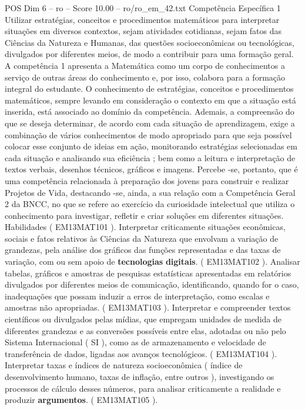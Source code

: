\begin{textsample}{POS Dim 6 – ro – Score 10.00 – ro/ro\_em\_42.txt}  \label{ex:f6_pos_134}
Competência Específica 1 Utilizar estratégias, conceitos e procedimentos matemáticos para interpretar situações em diversos contextos, sejam atividades cotidianas, sejam fatos das Ciências da Natureza e Humanas, das questões socioeconômicas ou tecnológicas, divulgados por diferentes meios, de modo a contribuir para uma formação geral.
A competência 1 apresenta a Matemática como um corpo de conhecimentos a serviço de outras áreas do conhecimento e, por isso, colabora para a formação integral do estudante.
O conhecimento de estratégias, conceitos e procedimentos matemáticos, sempre levando em consideração o contexto em que a situação está inserida, está associado ao domínio da competência.
Ademais, a compreensão do que se deseja determinar, de acordo com cada situação de aprendizagem, exige a combinação de vários conhecimentos de modo apropriado para que seja possível colocar esse conjunto de ideias em ação, monitorando estratégias selecionadas em cada situação e analisando sua eficiência ; bem como a leitura e interpretação de textos verbais, desenhos técnicos, gráficos e imagens.
Percebe -se, portanto, que é uma competência relacionada à preparação dos jovens para construir e realizar Projetos de Vida, destacando -se, ainda, a sua relação com a Competência Geral 2 da BNCC, no que se refere ao exercício da curiosidade intelectual que utiliza o conhecimento para investigar, refletir e criar soluções em diferentes situações.
Habilidades ( EM13MAT101 ).
Interpretar criticamente situações econômicas, sociais e fatos relativos às Ciências da Natureza que envolvam a variação de grandezas, pela análise dos gráficos das funções representadas e das taxas de variação, com ou sem apoio de \textbf{tecnologias} \textbf{digitais}. ( EM13MAT102 ).
Analisar tabelas, gráficos e amostras de pesquisas estatísticas apresentadas em relatórios divulgados por diferentes meios de comunicação, identificando, quando for o caso, inadequações que possam induzir a erros de interpretação, como escalas e amostras não apropriadas. ( EM13MAT103 ).
Interpretar e compreender textos científicos ou divulgados pelas mídias, que empregam unidades de medida de diferentes grandezas e as conversões possíveis entre elas, adotadas ou não pelo Sistema Internacional ( SI ), como as de armazenamento e velocidade de transferência de dados, ligadas aos avanços tecnológicos. ( EM13MAT104 ).
Interpretar taxas e índices de natureza socioeconômica ( índice de desenvolvimento humano, taxas de inflação, entre outros ), investigando os processos de cálculo desses números, para analisar criticamente a realidade e produzir \textbf{argumentos}. ( EM13MAT105 ).

\end{textsample}
